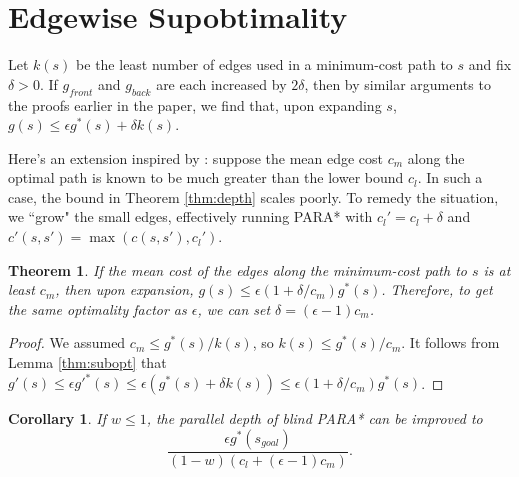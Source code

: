 \documentclass[letterpaper]{article}
\newtheorem{thm}{Theorem}
\newtheorem{cor}{Corollary}
\begin{document}
\section{Edgewise Supobtimality}

Let $k(s)$ be the least number of edges used in a minimum-cost path to $s$ and fix $\delta > 0$. If $g_{front}$ and $g_{back}$ are each increased by $2\delta$, then by similar arguments to the proofs earlier in the paper, we find that, upon expanding $s$, $g(s) \le \epsilon g^*(s) + \delta k(s)$.

Here's an extension inspired by \cite{klein1997randomized}: suppose the mean edge cost $c_m$ along the optimal path is known to be much greater than the lower bound $c_l$. In such a case, the bound in Theorem \ref{thm:depth} scales poorly. To remedy the situation, we ``grow" the small edges, effectively running PARA* with $c_l' = c_l + \delta$ and $c'(s,s') = \max(c(s,s'), c_l')$.

\begin{thm}
\label{thm:delta}
If the mean cost of the edges along the minimum-cost path to $s$ is at least $c_m$, then upon expansion, $g(s) \le \epsilon(1+\delta/c_m)g^*(s)$. Therefore, to get the same optimality factor as $\epsilon$, we can set $\delta = (\epsilon-1)c_m$.
\end{thm}

\begin{proof}
We assumed $c_m \le g^*(s) / k(s)$, so $k(s) \le g^*(s) / c_m$.
It follows from Lemma \ref{thm:subopt} that $g'(s) \le \epsilon g'^*(s) \le \epsilon(g^*(s) + \delta k(s)) \le \epsilon(1+\delta/c_m)g^*(s)$.
\end{proof}

\begin{cor}
\label{cor:delta}
If $w \le 1$, the parallel depth of blind PARA* can be improved to
\[\frac{\epsilon g^*(s_{goal})}{(1-w)(c_l+(\epsilon-1)c_m)}.\]
\end{cor}



\end{document}
